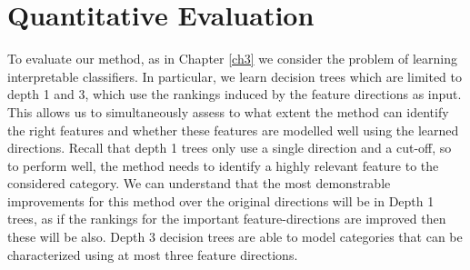 \section{Quantitative Evaluation}\label{secExperiments}

To evaluate our method, as in Chapter \ref{ch3} we consider the problem of learning interpretable classifiers. In particular, we learn decision trees which are limited to depth 1 and 3, which use the rankings induced by the feature directions as input. This allows us to simultaneously assess to what extent the method can identify the right features and whether these features are modelled well using the learned directions. Recall that depth 1 trees only use a single direction and a cut-off, so to perform well, the method needs to identify a highly relevant feature to the considered category. We can understand that the most demonstrable improvements for this method over the original directions will be in Depth 1 trees, as if the rankings for the important feature-directions are improved then these will be also. Depth 3 decision trees are able to model categories that can be characterized using at most three feature directions.



